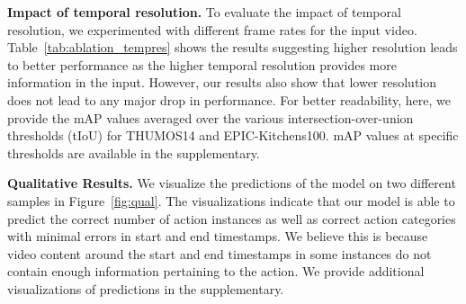 \documentclass[10pt,twocolumn,letterpaper]{article}
\begin{document}
 \setlength{\tabcolsep}{4pt}
\renewcommand{\arraystretch}{0.95}
\begin{table}[t]
\centering
\caption{\textbf{ Ablation Study (Impact of temporal resolution).} Performance of our AGT for different temporal resolutions of input video. Here, SR indicates sampling rate of frames for feature extraction, \ie, SR=1/ means frames sampled at 1/ -th factor of the original frame rate. EPIC(A), EPIC (V), EPIC (N) indicate tasks `Action', `Verb', `Noun' on dataset EPIC-Kitchens100. We report mAP for evaluation (higher is better).}
\vspace{-4mm}
\label{tab:ablation_tempres}
\end{table}
 

\vspace{0.05in}
\noindent
\textbf{Impact of temporal resolution.} To evaluate the impact of temporal resolution, we experimented with different frame rates for the input video. Table~\ref{tab:ablation_tempres} shows the results suggesting higher resolution leads to better performance as the higher temporal resolution provides more information in the input. However, our results also show that lower resolution does not lead to any major drop in performance. For better readability, here, we provide the mAP values averaged over the various intersection-over-union thresholds (tIoU) for THUMOS14 and EPIC-Kitchens100. mAP values at specific thresholds are available in the supplementary.


\vspace{0.05in}
\noindent 
\textbf{Qualitative Results.}
We visualize the predictions of the model on two different samples in Figure~\ref{fig:qual}. The visualizations indicate that our model is able to predict the correct number of action instances as well as correct action categories with minimal errors in start and end timestamps. We believe this is because video content around the start and end timestamps in some instances do not contain enough information pertaining to the action. We provide additional visualizations of  predictions in the supplementary. 
\end{document}

